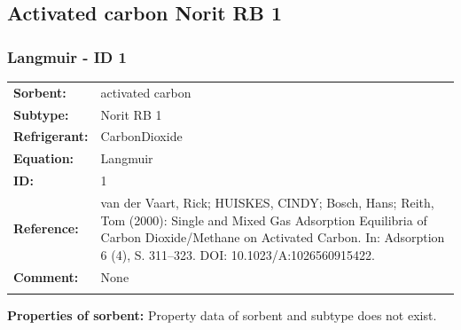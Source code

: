 \subsection{Activated carbon Norit RB 1}
%
\subsubsection{Langmuir - ID 1}
%
\begin{tabular}[l]{|lp{11.5cm}|}
\hline
\addlinespace

\textbf{Sorbent:} & activated carbon \\
\textbf{Subtype:} & Norit RB 1 \\
\textbf{Refrigerant:} & CarbonDioxide \\
\textbf{Equation:} & Langmuir \\
\textbf{ID:} & 1 \\
\textbf{Reference:} & van der Vaart, Rick; HUISKES, CINDY; Bosch, Hans; Reith, Tom (2000): Single and Mixed Gas Adsorption Equilibria of Carbon Dioxide/Methane on Activated Carbon. In: Adsorption 6 (4), S. 311–323. DOI: 10.1023/A:1026560915422. \\
\textbf{Comment:} & None \\

\addlinespace
\hline
\end{tabular}
\newline

\textbf{Properties of sorbent:}
\newline
%
Property data of sorbent and subtype does not exist.

